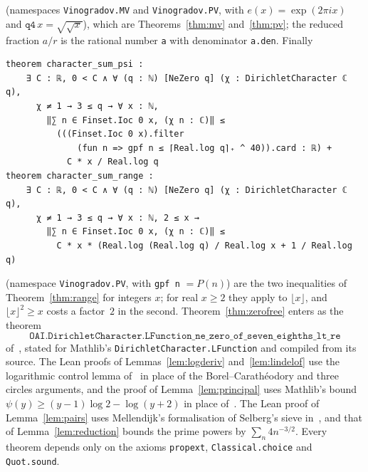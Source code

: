 \documentclass[12pt]{amsart}
\theoremstyle{remark}
\begin{document}
\noindent(namespaces \texttt{Vinogradov.MV} and \texttt{Vinogradov.PV}, with
$e(x)=\exp(2\pi ix)$ and $\texttt{q4}\,x=\sqrt{\sqrt x}$), which are Theorems~\ref{thm:mv}
and~\ref{thm:pv}; the reduced fraction $a/r$ is the rational number \texttt{a} with denominator
\texttt{a.den}. Finally
{\footnotesize
\begin{verbatim}
theorem character_sum_psi :
    ∃ C : ℝ, 0 < C ∧ ∀ (q : ℕ) [NeZero q] (χ : DirichletCharacter ℂ q),
      χ ≠ 1 → 3 ≤ q → ∀ x : ℕ,
        ‖∑ n ∈ Finset.Ioc 0 x, (χ n : ℂ)‖ ≤
          (((Finset.Ioc 0 x).filter
              (fun n => gpf n ≤ ⌈Real.log q⌉₊ ^ 40)).card : ℝ) +
            C * x / Real.log q
theorem character_sum_range :
    ∃ C : ℝ, 0 < C ∧ ∀ (q : ℕ) [NeZero q] (χ : DirichletCharacter ℂ q),
      χ ≠ 1 → 3 ≤ q → ∀ x : ℕ, 2 ≤ x →
        ‖∑ n ∈ Finset.Ioc 0 x, (χ n : ℂ)‖ ≤
          C * x * (Real.log (Real.log q) / Real.log x + 1 / Real.log q)
\end{verbatim}}
\noindent(namespace \texttt{Vinogradov.PV}, with \texttt{gpf n} $=P(n)$) are the two inequalities
of Theorem~\ref{thm:range} for integers $x$; for real $x\ge2$ they apply to $\lfloor x\rfloor$,
and $\lfloor x\rfloor^2\ge x$ costs a factor~$2$ in the second.
Theorem~\ref{thm:zerofree} enters as the theorem
\[
  \texttt{OAI.DirichletCharacter.LFunction\_ne\_zero\_of\_seven\_eighths\_lt\_re}
\]
of~\cite{OAI26}, stated for Mathlib's \texttt{DirichletCharacter.LFunction} and compiled from its
source.
The Lean proofs of Lemmas~\ref{lem:logderiv} and~\ref{lem:lindelof} use the logarithmic
control lemma of~\cite{OAI26} in place of the Borel--Carath\'eodory and three circles arguments,
and the proof of
Lemma~\ref{lem:principal} uses Mathlib's bound $\psi(y)\ge(y-1)\log2-\log(y+2)$ in place
of~\cite{Nai82}. The Lean proof of Lemma~\ref{lem:pairs} uses Mellendijk's formalisation of
Selberg's sieve in~\cite{PNT}, and that of Lemma~\ref{lem:reduction} bounds the prime powers by
$\sum_n4n^{-3/2}$. Every theorem depends only on the axioms \texttt{propext},
\texttt{Classical.choice} and \texttt{Quot.sound}.
\end{document}
